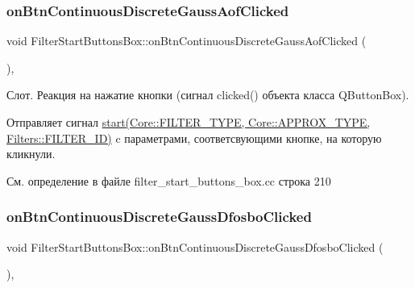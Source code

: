 \hypertarget{class_filter_start_buttons_box_ae7a3648f3c75d184a32cb42e7e1f4d84}{}\label{class_filter_start_buttons_box_ae7a3648f3c75d184a32cb42e7e1f4d84} 
\subsubsection{\texorpdfstring{on\+Btn\+Continuous\+Discrete\+Gauss\+Aof\+Clicked}{onBtnContinuousDiscreteGaussAofClicked}}
{\footnotesize\ttfamily void Filter\+Start\+Buttons\+Box\+::on\+Btn\+Continuous\+Discrete\+Gauss\+Aof\+Clicked (\begin{DoxyParamCaption}{ }\end{DoxyParamCaption})\hspace{0.3cm}{\ttfamily [private]}, {\ttfamily [slot]}}

Слот. Реакция на нажатие кнопки (сигнал clicked() объекта класса Q\+Button\+Box).

Отправляет сигнал \hyperlink{class_filter_start_buttons_box_ac6e2a6555f1d388391f188f834b8e753}{start(\+Core\+::\+F\+I\+L\+T\+E\+R\+\_\+\+T\+Y\+P\+E, Core\+::\+A\+P\+P\+R\+O\+X\+\_\+\+T\+Y\+P\+E, Filters\+::\+F\+I\+L\+T\+E\+R\+\_\+\+I\+D)} c параметрами, соответсвующими кнопке, на которую кликнули. 

См. определение в файле filter\+\_\+start\+\_\+buttons\+\_\+box.\+cc строка 210

\hypertarget{class_filter_start_buttons_box_af89dad25104363913b9a965cbfd417e8}{}\label{class_filter_start_buttons_box_af89dad25104363913b9a965cbfd417e8} 
\subsubsection{\texorpdfstring{on\+Btn\+Continuous\+Discrete\+Gauss\+Dfosbo\+Clicked}{onBtnContinuousDiscreteGaussDfosboClicked}}
{\footnotesize\ttfamily void Filter\+Start\+Buttons\+Box\+::on\+Btn\+Continuous\+Discrete\+Gauss\+Dfosbo\+Clicked (\begin{DoxyParamCaption}{ }\end{DoxyParamCaption})\hspace{0.3cm}{\ttfamily [private]}, {\ttfamily [slot]}}

